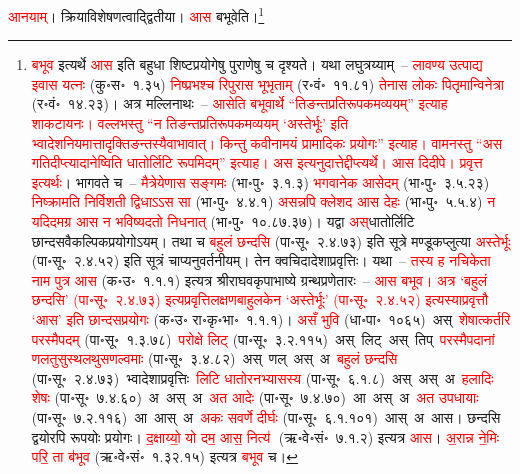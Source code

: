 \begin{sloppypar}
\textcolor{red}{आनयाम्}। क्रिया\-विशेषणत्वाद्द्वितीया। \textcolor{red}{आस} बभूवेति।\footnote{\textcolor{red}{बभूव} इत्यर्थे \textcolor{red}{आस} इति बहुधा शिष्टप्रयोगेषु पुराणेषु च दृश्यते। यथा लघुत्रय्याम्~– \textcolor{red}{लावण्य उत्पाद्य इवास यत्नः} (कु॰स॰~१.३५) \textcolor{red}{निष्प्रभश्च रिपुरास भूभृताम्} (र॰वं॰~११.८१) \textcolor{red}{तेनास लोकः पितृमान्विनेत्रा} (र॰वं॰~१४.२३)। अत्र मल्लिनाथः~– \textcolor{red}{आसेति बभूवार्थे “तिङन्त\-प्रतिरूपकमव्ययम्” इत्याह शाकटायनः। वल्लभस्तु “न तिङन्त\-प्रतिरूपकमव्ययम् ‘अस्तेर्भूः’ इति भ्वादेश\-नियमात्तादृक्तिङन्तस्यैवाभावात्। किन्तु कवीनामयं प्रामादिकः प्रयोगः” इत्याह। वामनस्तु “अस गतिदीप्त्यादानेष्विति धातोर्लिटि रूपमिदम्” इत्याह। अस इत्यनुदात्तेद्दीप्त्यर्थे। आस दिदीपे। प्रवृत्त इत्यर्थः}। भागवते च~– \textcolor{red}{मैत्रेयेणास सङ्गमः} (भा॰पु॰~३.१.३) \textcolor{red}{भगवानेक आसेदम्} (भा॰पु॰~३.५.२३) \textcolor{red}{निष्क्रामति निर्विशती द्विधाऽऽस सा} (भा॰पु॰~४.४.१) \textcolor{red}{असन्नपि क्लेशद आस देहः} (भा॰पु॰~५.५.४) \textcolor{red}{न यदिदमग्र आस न भविष्यदतो निधनात्} (भा॰पु॰~१०.८७.३७)। यद्वा \textcolor{red}{अस्‌}\-धातोर्लिटि छान्दस\-वैकल्पिक\-प्रयोगोऽयम्। तथा च \textcolor{red}{बहुलं छन्दसि} (पा॰सू॰~२.४.७३) इति सूत्रे मण्डूकप्लुत्या \textcolor{red}{अस्तेर्भूः} (पा॰सू॰~२.४.५२) इति सूत्रं चाप्यनुवर्तनीयम्। तेन क्वचिदादेशाप्रवृत्तिः। यथा~– \textcolor{red}{तस्य ह नचिकेता नाम पुत्र आस} (क॰उ॰~१.१.१) इत्यत्र श्रीराघव\-कृपा\-भाष्ये ग्रन्थ\-प्रणेतारः~– \textcolor{red}{आस बभूव। अत्र ‘बहुलं छन्दसि’ (पा॰सू॰~२.४.७३) इत्यप्रवृत्ति\-लक्षण\-बाहुलकेन ‘अस्तेर्भूः’ (पा॰सू॰~२.४.५२) इत्यस्याप्रवृत्तौ ‘आस’ इति छान्दस\-प्रयोगः} (क॰उ॰ रा॰कृ॰भा॰~१.१.१)। \textcolor{red}{असँ भुवि} (धा॰पा॰~१०६५)~\arrow अस्~\arrow \textcolor{red}{शेषात्कर्तरि परस्मैपदम्} (पा॰सू॰~१.३.७८)~\arrow \textcolor{red}{परोक्षे लिट्} (पा॰सू॰~३.२.११५)~\arrow अस्~लिट्~\arrow अस्~तिप्~\arrow \textcolor{red}{परस्मैपदानां णलतुसुस्थलथुस\-णल्वमाः} (पा॰सू॰~३.४.८२)~\arrow अस्~णल्~\arrow अस्~अ~\arrow \textcolor{red}{बहुलं छन्दसि} (पा॰सू॰~२.४.७३)~\arrow भ्वादेशाप्रवृत्तिः~\arrow \textcolor{red}{लिटि धातोरनभ्यासस्य} (पा॰सू॰~६.१.८)~\arrow अस्~अस्~अ~\arrow \textcolor{red}{हलादिः शेषः} (पा॰सू॰~७.४.६०)~\arrow अ~अस्~अ~\arrow \textcolor{red}{अत आदेः} (पा॰सू॰~७.४.७०)~\arrow आ~अस्~अ~\arrow \textcolor{red}{अत उपधायाः} (पा॰सू॰~७.२.११६)~\arrow आ~आस्~अ~\arrow \textcolor{red}{अकः सवर्णे दीर्घः} (पा॰सू॰~६.१.१०१)~\arrow आस्~अ~\arrow आस। छन्दसि द्वयोरपि रूपयोः प्रयोगः। \textcolor{red}{द॒क्षाय्यो॒ यो दम॒ आस॒ नित्य॑} (ऋ॰वे॰सं॰~७.१.२) इत्यत्र \textcolor{red}{आस}। \textcolor{red}{अ॒रान्न ने॒मिः परि॒ ता ब॑भूव} (ऋ॰वे॰सं॰~१.३२.१५) इत्यत्र \textcolor{red}{बभूव} च।}\end{sloppypar}
